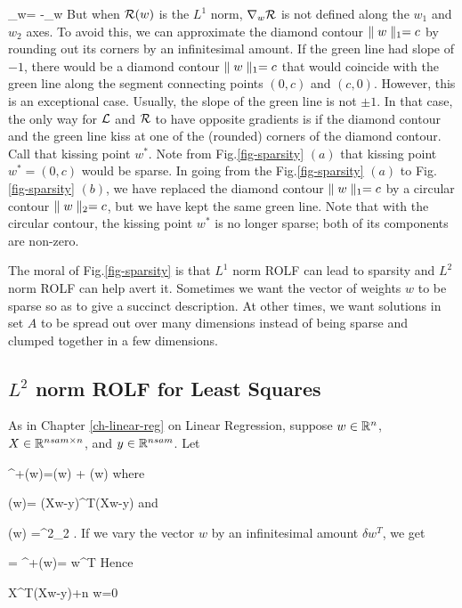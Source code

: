 \beq
\nabla_w\call = -\nabla_w \calr
\eeq
But when ${\cal R}(w)$ is
the $L^1$ norm,  $\nabla_w{\cal R}$ is not defined along the $w_1$
and $w_2$ axes. To avoid this, we can
approximate the diamond contour $\parallel w\parallel_1=c$
by rounding out its corners
by an infinitesimal amount. If the green line had
slope of $-1$,
there would be a diamond contour
 $\parallel w\parallel_1=c$ that would coincide with the green line along the
 segment connecting points $(0,c)$
 and $(c,0)$. However, this is an exceptional case. Usually, the slope
 of the green line is not $\pm 1$.
 In that case, the only way for
 ${\cal L}$ and ${\cal R}$ to have
 opposite gradients is if the diamond
 contour and the green line
 kiss at one of the (rounded)  corners
 of the diamond contour. Call that
 kissing point $w^*$. Note from
 Fig.\ref{fig-sparsity} $(a)$ that kissing point $w^*=(0,c)$ would be
 sparse. In going from the Fig.\ref{fig-sparsity} $(a)$ to Fig.\ref{fig-sparsity} $(b)$,
 we have replaced the diamond contour
 $\parallel w\parallel_1=c$ by
 a circular contour $\parallel w\parallel_2=c$,
 but we have kept the same green line.
 Note that with the circular contour,
 the kissing point $w^*$ is no longer sparse; both of its components are non-zero.

 The moral of Fig.\ref{fig-sparsity}
 is that $L^1$ norm ROLF can lead to sparsity and $L^2$ norm ROLF can help avert it.
 Sometimes we want the vector of weights $w$ to be sparse so as to give
 a succinct description.
 At other times, we want solutions in set $A$ to be spread out over many dimensions instead of being sparse and 
 clumped together in a few dimensions.






\subsection{$L^2$ norm ROLF for Least Squares}
As in Chapter \ref{ch-linear-reg} on Linear Regression,
suppose $w\in{ \mathbb{R}}^n$, $X\in { \mathbb{R}}^{nsam\times n}$,
 and  $y\in{ \mathbb{R}}^{nsam} $. Let

\beq
\call^+(w)=\call(w) + \calr(w)
\eeq
where

\beq
\call(w)=
(Xw-y)^T(Xw-y)
\eeq
and

\beq
\calr(w) =\lam{}^2_2
\;.
\eeq
If we vary the  vector $w$ by an
infinitesimal amount $\delta w^T$, we get

= \delta\call^+(w)=
\delta w^T
\eeq
Hence

\beq
X^T(Xw-y)+\lam n  w=0
\eeq

